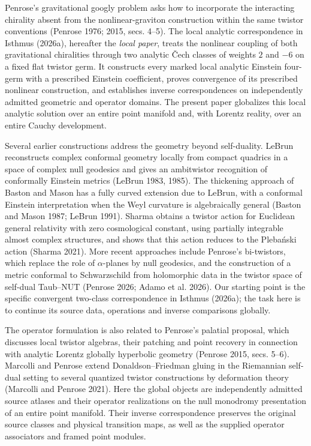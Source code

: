 \documentclass[
  english,
  11pt,
  reqno]{amsart}
\begin{document}
Penrose's gravitational googly problem asks how to incorporate the
interacting chirality absent from the nonlinear-graviton construction
within the same twistor conventions (Penrose 1976; 2015, secs. 4--5).
The local analytic correspondence in Isthmus (2026a), hereafter the
\emph{local paper}, treats the nonlinear coupling of both gravitational
chiralities through two analytic Čech classes of weights \(2\) and
\(-6\) on a fixed flat twistor germ. It constructs every marked local
analytic Einstein four-germ with a prescribed Einstein coefficient,
proves convergence of its prescribed nonlinear construction, and
establishes inverse correspondences on independently admitted geometric
and operator domains. The present paper globalizes this local analytic
solution over an entire point manifold and, with Lorentz reality, over
an entire Cauchy development.

Several earlier constructions address the geometry beyond self-duality.
LeBrun reconstructs complex conformal geometry locally from compact
quadrics in a space of complex null geodesics and gives an ambitwistor
recognition of conformally Einstein metrics (LeBrun 1983, 1985). The
thickening approach of Baston and Mason has a fully curved extension due
to LeBrun, with a conformal Einstein interpretation when the Weyl
curvature is algebraically general (Baston and Mason 1987; LeBrun 1991).
Sharma obtains a twistor action for Euclidean general relativity with
zero cosmological constant, using partially integrable almost complex
structures, and shows that this action reduces to the Plebański action
(Sharma 2021). More recent approaches include Penrose's bi-twistors,
which replace the role of \(\alpha\)-planes by null geodesics, and the
construction of a metric conformal to Schwarzschild from holomorphic
data in the twistor space of self-dual Taub--NUT (Penrose 2026; Adamo et
al. 2026). Our starting point is the specific convergent two-class
correspondence in Isthmus (2026a); the task here is to continue its
source data, operations and inverse comparisons globally.

The operator formulation is also related to Penrose's palatial proposal,
which discusses local twistor algebras, their patching and point
recovery in connection with analytic Lorentz globally hyperbolic
geometry (Penrose 2015, secs. 5--6). Marcolli and Penrose extend
Donaldson--Friedman gluing in the Riemannian self-dual setting to
several quantized twistor constructions by deformation theory (Marcolli
and Penrose 2021). Here the global objects are independently admitted
source atlases and their operator realizations on the null monodromy
presentation of an entire point manifold. Their inverse correspondence
preserves the original source classes and physical transition maps, as
well as the supplied operator associators and framed point modules.
\end{document}
